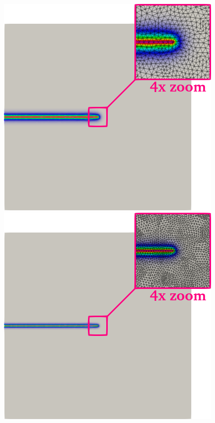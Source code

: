 \documentclass{report}
\begin{document}
\begin{figure}[tb]
\begin{minipage}[t]{.3\textwidth}
		\centering \includegraphics[width=.92\textwidth]{./Images/d-level2.png}
	\end{minipage}
	\begin{minipage}[t]{.3\textwidth}
		\centering \includegraphics[width=.92\textwidth]{./Images/d-level3.png}

\end{minipage}
\end{figure}
\end{document}
